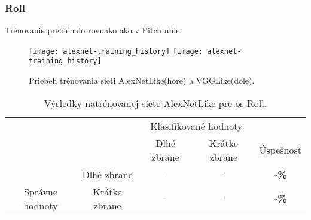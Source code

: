 \subsubsection{Roll}
Trénovanie prebiehalo rovnako ako v Pitch uhle.

\begin{figure}[H]
    \centering
    \texttt{[image: alexnet-training\_history]} %
    \quad
	\texttt{[image: alexnet-training\_history]} %
	\caption{Priebeh trénovania sieti AlexNetLike(hore) a VGGLike(dole).}
	\label{pic:rollaxis}
\end{figure}

\begin{table}[H]
    \centering
    \begin{tabular}{ccccc}
                                                                &                                    & \multicolumn{2}{c}{Klasifikované hodnoty}                                                         &                                    \\ \cline{3-5} 
                                                                & \multicolumn{1}{c|}{}              & \multicolumn{1}{c|}{Dlhé zbrane}                & \multicolumn{1}{c|}{Krátke zbrane}              & \multicolumn{1}{c|}{Úspešnosť}     \\ \cline{2-5} 
        \multicolumn{1}{c|}{}                                  & \multicolumn{1}{c|}{Dlhé zbrane}   & \multicolumn{1}{c|}{{\color[HTML]{009901} -}} & \multicolumn{1}{c|}{{\color[HTML]{9A0000} -}}  & \multicolumn{1}{c|}{\textbf{-\%}} \\ \cline{2-5} 
        \multicolumn{1}{c|}{\multirow{-2}{*}{Správne hodnoty}} & \multicolumn{1}{c|}{Krátke zbrane} & \multicolumn{1}{c|}{{\color[HTML]{9A0000} -}}  & \multicolumn{1}{c|}{{\color[HTML]{009901} -}} & \multicolumn{1}{c|}{\textbf{-\%}} \\ \cline{2-5} 
    \end{tabular}
    \caption{Výsledky natrénovanej siete AlexNetLike pre os Roll.}
    \label{tab:alexnetrollresults}
\end{table}

